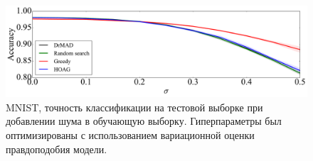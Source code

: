    \begin{figure}

    \includegraphics[width=\linewidth]{plots/hyperparams/Fig_noise.pdf}

    \caption{MNIST, точность классификации на тестовой выборке при добавлении шума в обучающую выборку. Гиперпараметры был оптимизированы с использованием вариационной оценки правдоподобия модели.}
    \label{fig:noise}
    \end{figure}






